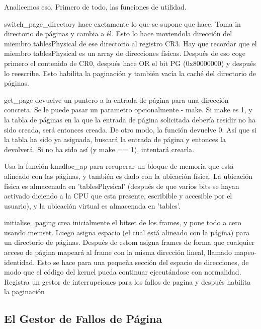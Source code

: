 \documentclass{report}
\begin{document}
Analicemos eso. Primero de todo, las funciones de utilidad.

switch\_page\_directory hace exctamente lo que se supone que hace. Toma in directorio de páginas y cambia a él. Esto lo hace moviendola dirección del miembro tablesPhysical de ese directorio al registro CR3. Hay que recordar que el miembro tablesPhysical es un array de direcciones físicas. Después de eso coge primero el contenido de CR0, después hace OR el bit PG (0x80000000) y después lo reescribe. Esto habilita la paginación y también vacía la caché del directorio de páginas.

get\_page devuelve un puntero a la entrada de página para una dirección concreta. Se le puede pasar un parametro opcionalmente - make. Si make es 1, y la tabla de páginas en la que la entrada de página solicitada debería residir no ha sido creada, será entonces creada. De otro modo, la función devuelve 0. Así que si la tabla ha sido ya asignada, buscará la entrada de página y entonces la devolverá. Si no ha sido así (y make == 1), intentará crearla.

Usa la función kmalloc\_ap para recuperar un bloque de memoria que está alineado con las páginas, y también es dado con la ubicación física. La ubicación física es almacenada en 'tablesPhysical' (después de que varios bits se hayan activado diciendo a la CPU que esta presente, escribible y accesible por el usuario), y la ubicación virtual es almacenada en 'tables'.

initialise\_paging crea inicialmente el bitset de los frames, y pone todo a cero usando memset. Luego asigna espacio (el cual está alineado con la página) para un directorio de páginas. Después de estom asigna frames de forma que cualquier acceso de página mapeará al frame con la misma dirección lineal, llamado mapeo-identidad. Esto se hace para una pequeña sección del espacio de direcciones, de modo que el código del kernel pueda continuar ejecutándose con normalidad. Registra un gestor de interrupciones para los fallos de pagina y después habilita la paginación


\subsection{El Gestor de Fallos de Página}
\end{document}

